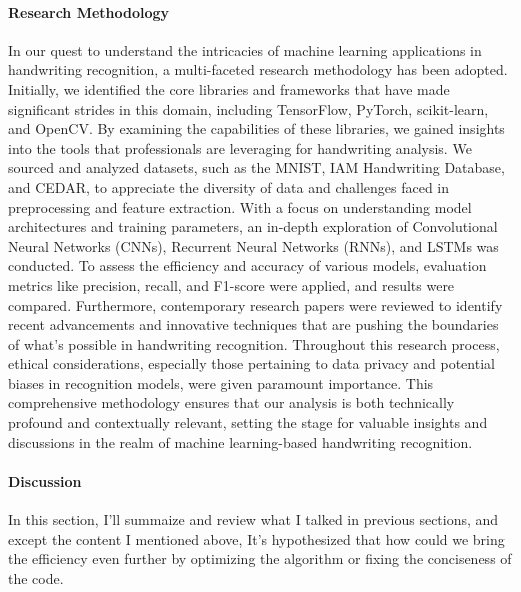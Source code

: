 \documentclass[12pt]{article}
\begin{document}
\paragraph{Research Methodology}
In our quest to understand the intricacies of machine learning applications in handwriting recognition, a multi-faceted research methodology has been adopted. Initially, we identified the core libraries and frameworks that have made significant strides in this domain, including TensorFlow, PyTorch, scikit-learn, and OpenCV. By examining the capabilities of these libraries, we gained insights into the tools that professionals are leveraging for handwriting analysis. We sourced and analyzed datasets, such as the MNIST, IAM Handwriting Database, and CEDAR, to appreciate the diversity of data and challenges faced in preprocessing and feature extraction. With a focus on understanding model architectures and training parameters, an in-depth exploration of Convolutional Neural Networks (CNNs), Recurrent Neural Networks (RNNs), and LSTMs was conducted. To assess the efficiency and accuracy of various models, evaluation metrics like precision, recall, and F1-score were applied, and results were compared. Furthermore, contemporary research papers were reviewed to identify recent advancements and innovative techniques that are pushing the boundaries of what’s possible in handwriting recognition. Throughout this research process, ethical considerations, especially those pertaining to data privacy and potential biases in recognition models, were given paramount importance. This comprehensive methodology ensures that our analysis is both technically profound and contextually relevant, setting the stage for valuable insights and discussions in the realm of machine learning-based handwriting recognition.

\paragraph{Discussion}
In this section, I'll summaize and review what I talked in previous sections, and except the content I mentioned above, It's hypothesized that how could we bring the efficiency even further by optimizing the algorithm or fixing the conciseness of the code. 



\cite{824821}
\cite{NIPS2008_66368270}
\cite{6981034}
\end{document}
